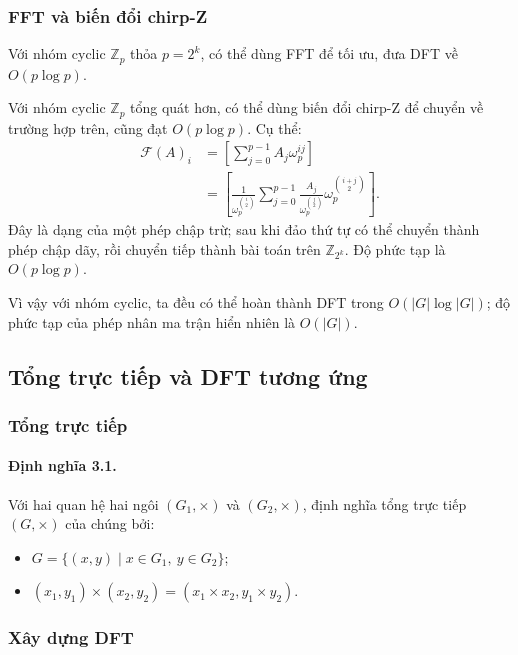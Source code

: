 \documentclass[11pt]{article}
\begin{document}
\subsubsection{FFT và biến đổi chirp-Z}

Với nhóm cyclic $\mathbb Z_p$ thỏa $p=2^k$, có thể dùng FFT để tối ưu, đưa DFT
về $O(p\log p)$.

Với nhóm cyclic $\mathbb Z_p$ tổng quát hơn, có thể dùng biến đổi chirp-Z để
chuyển về trường hợp trên, cũng đạt $O(p\log p)$. Cụ thể:
\[
\begin{aligned}
\mathcal F(A)_i
&=\left[\sum_{j=0}^{p-1} A_j\omega_p^{ij}\right]\\
&=\left[\frac{1}{\omega_p^{\binom{i}{2}}}
  \sum_{j=0}^{p-1}\frac{A_j}{\omega_p^{\binom{j}{2}}}
  \omega_p^{\binom{i+j}{2}}\right].
\end{aligned}
\]
Đây là dạng của một phép chập trừ; sau khi đảo thứ tự có thể chuyển thành phép
chập dãy, rồi chuyển tiếp thành bài toán trên $\mathbb Z_{2^k}$. Độ phức tạp là
$O(p\log p)$.

Vì vậy với nhóm cyclic, ta đều có thể hoàn thành DFT trong
$O(|G|\log |G|)$; độ phức tạp của phép nhân ma trận hiển nhiên là $O(|G|)$.

\subsection{Tổng trực tiếp và DFT tương ứng}

\subsubsection{Tổng trực tiếp}

\paragraph{Định nghĩa 3.1.}
Với hai quan hệ hai ngôi $(G_1,\times)$ và $(G_2,\times)$, định nghĩa tổng trực
tiếp $(G,\times)$ của chúng bởi:
\begin{itemize}
  \item $G=\{(x,y)\mid x\in G_1,\ y\in G_2\}$;
  \item $(x_1,y_1)\times(x_2,y_2)=(x_1\times x_2,y_1\times y_2)$.
\end{itemize}

\subsubsection{Xây dựng DFT}
\end{document}
